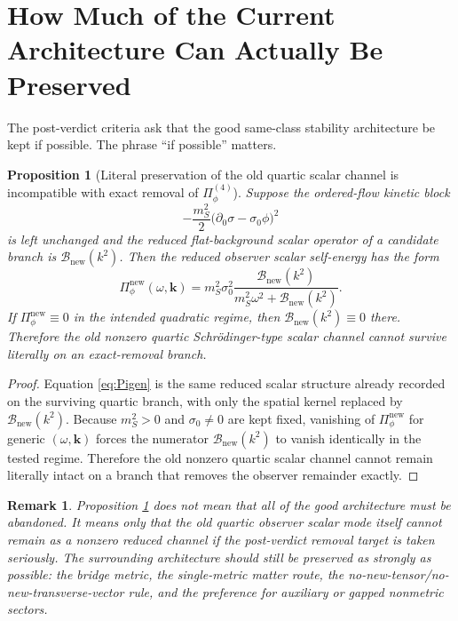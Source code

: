 \documentclass[11pt]{article}
\newtheorem{proposition}{Proposition}
\newtheorem{remark}{Remark}
\begin{document}
\section{How Much of the Current Architecture Can Actually Be Preserved}

The post-verdict criteria ask that the good same-class stability architecture be kept if possible. The phrase ``if possible'' matters.

\begin{proposition}[Literal preservation of the old quartic scalar channel is incompatible with exact removal of \texorpdfstring{\(\Pi_\phi^{(4)}\)}{Pi}]
\label{prop:notliteral}
Suppose the ordered-flow kinetic block
\begin{equation}
-\frac{m_S^2}{2}\bigl(\partial_0\sigma-\sigma_0\phi\bigr)^2
\label{eq:kin}
\end{equation}
is left unchanged and the reduced flat-background scalar operator of a candidate branch is \(\mathcal B_{\mathrm{new}}(k^2)\). Then the reduced observer scalar self-energy has the form
\begin{equation}
\Pi_\phi^{\mathrm{new}}(\omega,\mathbf{k})
=
m_S^2\sigma_0^2
\frac{\mathcal B_{\mathrm{new}}(k^2)}
{m_S^2\omega^2+\mathcal B_{\mathrm{new}}(k^2)}.
\label{eq:Pigen}
\end{equation}
If \(\Pi_\phi^{\mathrm{new}}\equiv 0\) in the intended quadratic regime, then \(\mathcal B_{\mathrm{new}}(k^2)\equiv 0\) there. Therefore the old nonzero quartic Schr\"odinger-type scalar channel cannot survive literally on an exact-removal branch.
\end{proposition}

\begin{proof}
Equation \eqref{eq:Pigen} is the same reduced scalar structure already recorded on the surviving quartic branch, with only the spatial kernel replaced by \(\mathcal B_{\mathrm{new}}(k^2)\). Because \(m_S^2>0\) and \(\sigma_0\neq 0\) are kept fixed, vanishing of \(\Pi_\phi^{\mathrm{new}}\) for generic \((\omega,\mathbf{k})\) forces the numerator \(\mathcal B_{\mathrm{new}}(k^2)\) to vanish identically in the tested regime. Therefore the old nonzero quartic scalar channel cannot remain literally intact on a branch that removes the observer remainder exactly.
\end{proof}

\begin{remark}
Proposition \ref{prop:notliteral} does not mean that all of the good architecture must be abandoned. It means only that the old quartic observer scalar mode itself cannot remain as a nonzero reduced channel if the post-verdict removal target is taken seriously. The surrounding architecture should still be preserved as strongly as possible: the bridge metric, the single-metric matter route, the no-new-tensor/no-new-transverse-vector rule, and the preference for auxiliary or gapped nonmetric sectors.
\end{remark}
\end{document}
